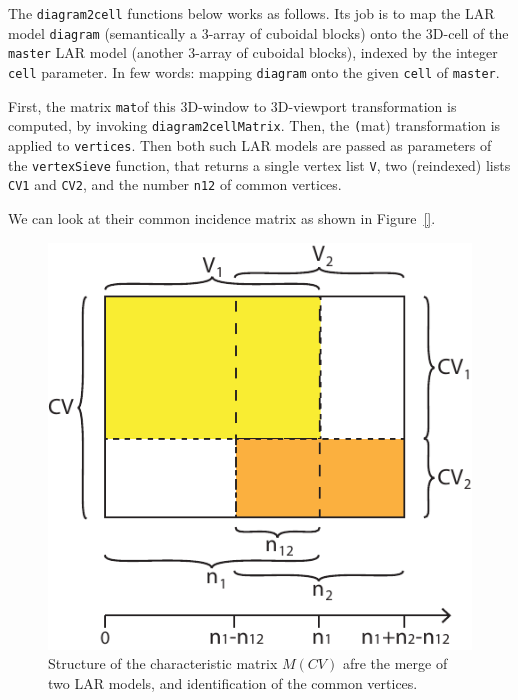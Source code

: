 \documentclass[11pt,oneside]{article}	%
\begin{document}
The \texttt{diagram2cell} functions below works as follows.  Its job is to map the LAR model \texttt{diagram} (semantically a 3-array of cuboidal blocks) onto the 3D-cell of the \texttt{master} LAR model (another 3-array of cuboidal blocks), indexed by the integer \texttt{cell} parameter. In few words: mapping \texttt{diagram} onto the given \texttt{cell} of \texttt{master}.

First, the matrix \texttt{mat}of this 3D-window to 3D-viewport transformation is computed, by invoking \texttt{diagram2cellMatrix}. Then, the \texttt(mat) transformation is applied to \texttt{vertices}.
Then both such LAR models are passed as parameters of the \texttt{vertexSieve} function, that returns a single vertex list \texttt{V}, two (reindexed) lists \texttt{CV1} and \texttt{CV2}, and the number \texttt{n12} of common vertices.

We can look at their common incidence matrix as shown in Figure~\ref{}.

\begin{figure}[htbp] %
   \centering
   \includegraphics[width=0.4\linewidth]{images/merge} 
   \caption{Structure of the characteristic matrix $M(CV)$ afre the merge of two LAR models, and identification of the common vertices.}
   \label{fig:example}
\end{figure}
\end{document}
